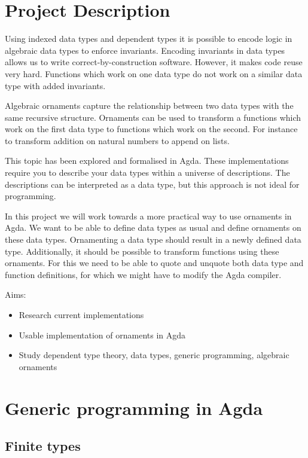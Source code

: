 
\section{Project Description}\label{sec:project-description}

Using indexed data types and dependent types it is possible to encode
logic in algebraic data types to enforce invariants.
Encoding invariants in data types allows us to write correct-by-construction
software.
However, it makes code reuse very hard.
Functions which work on one data type do not work on a similar data
type with added invariants.

Algebraic ornaments capture the relationship between two data types
with the same recursive structure.
Ornaments can be used to transform a functions which work on the first
data type to functions which work on the second.
For instance to transform addition on natural numbers to append on lists.

This topic has been explored and formalised in Agda.
These implementations require you to describe your data types within a
universe of descriptions.
The descriptions can be interpreted as a data type, but this approach is not ideal for programming.

In this project we will work towards a more practical way to use
ornaments in Agda.
We want to be able to define data types as usual and define ornaments
on these data types.
Ornamenting a data type should result in a newly defined data type.
Additionally, it should be possible to transform functions using these
ornaments.
For this we need to be able to quote and unquote both data type and function definitions, for which we might have to modify the Agda compiler.

Aims:

\begin{itemize}
\item Research current implementations
\item Usable implementation of ornaments in Agda
\item Study dependent type theory, data types, generic programming,
algebraic ornaments
\end{itemize}

\section{Generic programming in Agda}\label{sec:generic-programming-in-agda}


\subsection{Finite types}

